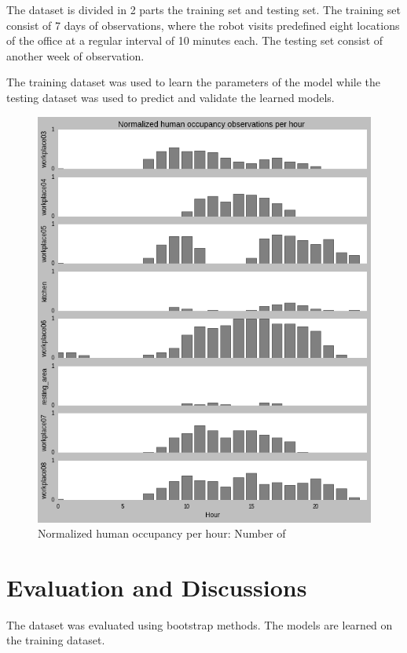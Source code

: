The dataset is divided in 2 parts the training set and testing set. The training set consist of 7 days of observations, where the robot visits predefined eight locations of the office at a regular interval of 10 minutes each. The testing set consist of another week of observation. 

The training dataset was used to learn the parameters of the model while the testing dataset was used to predict and validate the learned models. 



\begin{figure}[htp]
\centering
\includegraphics[width=\textwidth]{images/brayford_dataset_visualization.png}
\caption[Normalized human occupancy per hour]{Normalized human occupancy per hour: Number of }
\label{}
\end{figure}

\section{Evaluation and Discussions}

The dataset was evaluated using bootstrap methods. The models are learned on the training dataset. 



